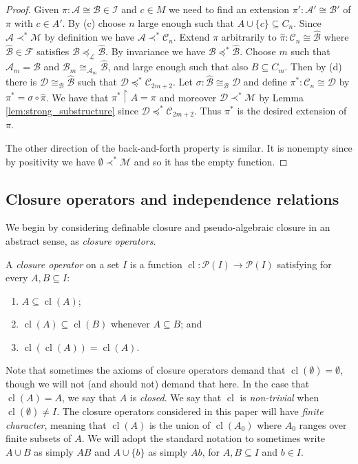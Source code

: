 \documentclass[12pt]{amsart}
\theoremstyle{plain}
\theoremstyle{definition}
\newcommand{\isom}{\cong}
\newcommand{\mcA}{\mathcal{A}}
\newcommand{\mcB}{\mathcal{B}}
\newcommand{\mcC}{\mathcal{C}}
\newcommand{\mcD}{\mathcal{D}}
\newcommand{\mcF}{\mathcal{F}}
\newcommand{\mcI}{\mathcal{I}}
\newcommand{\mcL}{\mathcal{L}}
\newcommand{\mcM}{\mathcal{M}}
\DeclareMathOperator{\cl}{cl}
\begin{document}
\begin{proof}
Given $\pi : \mcA \isom \mcB \in \mcI$ and $c \in M$ we need to find an extension $\pi' : \mcA' \isom \mcB'$ of $\pi$ with $c \in A'$.
By (c) choose $n$ large enough such that $A \cup\{c\} \subseteq C_n$.
Since $\mcA \prec^* \mcM$ by definition we have $\mcA \prec^* \mcC_n$.
Extend $\pi$ arbitrarily to $\hat{\pi} : \mcC_n \isom \hat{\mcB}$ where $\hat{\mcB} \in \mcF$ satisfies $\mcB \preceq_\mcL \hat{\mcB}$.
By invariance we have $\mcB \preceq^* \hat{\mcB}$.
Choose $m$ such that $\mcA_m = \mcB$ and $\mcB_m \isom_{\mcA_m} \hat{\mcB}$, and large enough such that also $B \subseteq C_m$.
Then by (d) there is $\mcD \isom_{\mcB} \hat{\mcB}$ such that $\mcD \preceq^* \mcC_{2m+2}$.
Let $\sigma : \hat{\mcB} \isom_{\mcB} \mcD$ and define $\pi^* :\mcC_{n} \isom \mcD$ by $\pi^* = \sigma \circ \hat{\pi}$.
We have that $\pi^* \upharpoonright A = \pi$ and moreover $\mcD \prec^* \mcM$ by Lemma \ref{lem:strong_substructure} since $\mcD \preceq^* \mcC_{2m+2}$.
Thus $\pi^*$ is the desired extension of $\pi$.

The other direction of the back-and-forth property is similar.
It is nonempty since by positivity we have $\emptyset \prec^* \mcM$ and so it has the empty function.
\end{proof}

\subsection{Closure operators and independence relations}

We begin by considering definable closure and pseudo-algebraic closure in an abstract sense, as \emph{closure operators}.

A \emph{closure operator} on a set $I$ is a function $\cl: \mathcal{P}(I) \rightarrow \mathcal{P}(I)$ satisfying for every $A, B \subseteq I$:
\begin{enumerate}
    \item $A \subseteq \cl(A)$;
    \item $\cl(A) \subseteq \cl(B)$ whenever $A \subseteq B$; and
    \item $\cl(\cl(A)) = \cl(A)$.
\end{enumerate}
Note that sometimes the axioms of closure operators demand that $\cl(\emptyset) = \emptyset$, though we will not (and should not) demand that here.
In the case that $\cl(A) = A$, we say that $A$ is \emph{closed}.
We say that  $\cl$ is \emph{non-trivial} when $\cl(\emptyset) \neq I$.
The closure operators considered in this paper will have \emph{finite character}, meaning that $\cl(A)$ is the union of $\cl(A_0)$ where $A_0$ ranges over finite subsets of $A$. 
We will adopt the standard notation to sometimes write $A \cup B$ as simply $AB$  and $A \cup \{b\}$ as simply $Ab$, for $A, B \subseteq I$ and $b \in I$.
\end{document}
